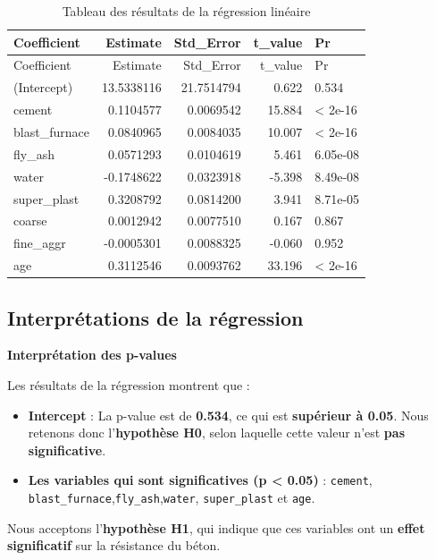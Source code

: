 \documentclass[
  12pt,
]{article}
\begin{document}
\begin{longtable}[]{@{}lrrrl@{}}
\caption{Tableau des résultats de la régression linéaire}\tabularnewline
\toprule\noalign{}
Coefficient & Estimate & Std\_Error & t\_value & Pr \\
\midrule\noalign{}
\endfirsthead
\toprule\noalign{}
Coefficient & Estimate & Std\_Error & t\_value & Pr \\
\midrule\noalign{}
\endhead
\bottomrule\noalign{}
\endlastfoot
(Intercept) & 13.5338116 & 21.7514794 & 0.622 & 0.534 \\
cement & 0.1104577 & 0.0069542 & 15.884 & \textless{} 2e-16 \\
blast\_furnace & 0.0840965 & 0.0084035 & 10.007 & \textless{} 2e-16 \\
fly\_ash & 0.0571293 & 0.0104619 & 5.461 & 6.05e-08 \\
water & -0.1748622 & 0.0323918 & -5.398 & 8.49e-08 \\
super\_plast & 0.3208792 & 0.0814200 & 3.941 & 8.71e-05 \\
coarse & 0.0012942 & 0.0077510 & 0.167 & 0.867 \\
fine\_aggr & -0.0005301 & 0.0088325 & -0.060 & 0.952 \\
age & 0.3112546 & 0.0093762 & 33.196 & \textless{} 2e-16 \\
\end{longtable}

\subsection{Interprétations de la
régression}\label{interpruxe9tations-de-la-ruxe9gression}

\textbf{Interprétation des p-values}

Les résultats de la régression montrent que :

\begin{itemize}
\item
  \textbf{Intercept} : La p-value est de \textbf{0.534}, ce qui est
  \textbf{supérieur à 0.05}. Nous retenons donc l'\textbf{hypothèse H0},
  selon laquelle cette valeur n'est \textbf{pas significative}.
\item
  \textbf{Les variables qui sont significatives (p \textless{} 0.05)} :
  \texttt{cement},
  \texttt{blast\_furnace},\texttt{fly\_ash},\texttt{water},
  \texttt{super\_plast} et \texttt{age}.
\end{itemize}

Nous acceptons l'\textbf{hypothèse H1}, qui indique que ces variables
ont un \textbf{effet significatif} sur la résistance du béton.
\end{document}
